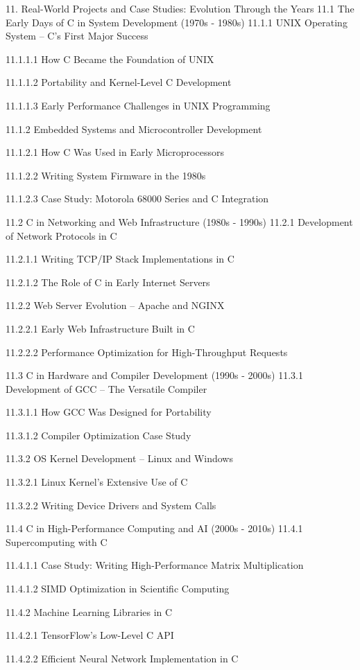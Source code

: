 11. Real-World Projects and Case Studies: Evolution Through the Years
11.1 The Early Days of C in System Development (1970s - 1980s)
11.1.1 UNIX Operating System – C’s First Major Success

11.1.1.1 How C Became the Foundation of UNIX

11.1.1.2 Portability and Kernel-Level C Development

11.1.1.3 Early Performance Challenges in UNIX Programming

11.1.2 Embedded Systems and Microcontroller Development

11.1.2.1 How C Was Used in Early Microprocessors

11.1.2.2 Writing System Firmware in the 1980s

11.1.2.3 Case Study: Motorola 68000 Series and C Integration

11.2 C in Networking and Web Infrastructure (1980s - 1990s)
11.2.1 Development of Network Protocols in C

11.2.1.1 Writing TCP/IP Stack Implementations in C

11.2.1.2 The Role of C in Early Internet Servers

11.2.2 Web Server Evolution – Apache and NGINX

11.2.2.1 Early Web Infrastructure Built in C

11.2.2.2 Performance Optimization for High-Throughput Requests

11.3 C in Hardware and Compiler Development (1990s - 2000s)
11.3.1 Development of GCC – The Versatile Compiler

11.3.1.1 How GCC Was Designed for Portability

11.3.1.2 Compiler Optimization Case Study

11.3.2 OS Kernel Development – Linux and Windows

11.3.2.1 Linux Kernel's Extensive Use of C

11.3.2.2 Writing Device Drivers and System Calls

11.4 C in High-Performance Computing and AI (2000s - 2010s)
11.4.1 Supercomputing with C

11.4.1.1 Case Study: Writing High-Performance Matrix Multiplication

11.4.1.2 SIMD Optimization in Scientific Computing

11.4.2 Machine Learning Libraries in C

11.4.2.1 TensorFlow’s Low-Level C API

11.4.2.2 Efficient Neural Network Implementation in C


